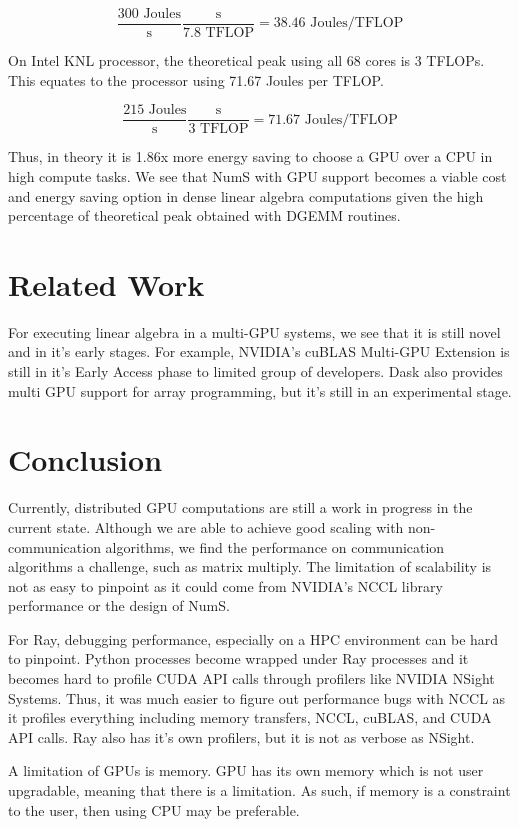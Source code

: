 \documentclass{article}
\begin{document}
$$\frac{300\textrm{ Joules}}{\textrm{s}}\frac{\textrm{s}}{7.8 \textrm{ TFLOP}} = 38.46 \textrm{ Joules/TFLOP}$$


On Intel KNL processor, the theoretical peak using all 68 cores is 3 TFLOPs. This equates to the processor using 71.67 Joules per TFLOP. \cite{knl}

$$\frac{215\textrm{ Joules}}{\textrm{s}}\frac{\textrm{s}}{3 \textrm{ TFLOP}} = 71.67 \textrm{ Joules/TFLOP}$$

Thus, in theory it is 1.86x more energy saving to choose a GPU over a CPU in high compute tasks. We see that NumS with GPU support becomes a viable cost and energy saving option in dense linear algebra computations given the high percentage of theoretical peak obtained with DGEMM routines.

\section{Related Work}
For executing linear algebra in a multi-GPU systems, we see that it is still novel and in it's early stages. For example, NVIDIA's cuBLAS Multi-GPU Extension is still in it's Early Access phase to limited group of developers. \cite{cublasmg} Dask also provides multi GPU support for array programming, but it's still in an experimental stage. \cite{dask-cuda}

\section{Conclusion}
Currently, distributed GPU computations are still a work in progress in the current state. Although we are able to achieve good scaling with non-communication algorithms, we find the performance on communication algorithms a challenge, such as matrix multiply. The limitation of scalability is not as easy to pinpoint as it could come from NVIDIA's NCCL library performance or the design of NumS.

For Ray, debugging performance, especially on a HPC environment can be hard to pinpoint. Python processes become wrapped under Ray processes and it becomes hard to profile CUDA API calls through profilers like NVIDIA NSight Systems. Thus, it was much easier to figure out performance bugs with NCCL as it profiles everything including memory transfers, NCCL, cuBLAS, and CUDA API calls. Ray also has it's own profilers, but it is not as verbose as NSight.

A limitation of GPUs is memory. GPU has its own memory which is not user upgradable, meaning that there is a limitation. As such, if memory is a constraint to the user, then using CPU may be preferable. 
\end{document}
